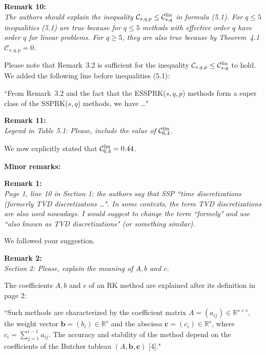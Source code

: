 \documentclass[12pt]{article}
\newcommand{\remark}[2]{\vspace{25pt} \noindent \textbf{Remark #1:\newline} \textit{#2}\vspace{15pt}}
\renewcommand{\newline}{\vspace{15pt}\\}
\newcommand{\sspcoef}{\mathcal{C}}
\newcommand{\clin}{\sspcoef^{\textnormal{lin}}_{s,q}}
\begin{document}
\remark{10}{
The authors should explain the inequality $\sspcoef_{s,q,p} \leq \clin$ in formula (5.1). 
For $q \leq 5$ inequalities (5.1) are true because for $q \leq 5$ methods with effective 
order $q$ have order $q$ for linear problems. 
For $q \geq 5$, they are also true because by Theorem~4.1 $\sspcoef_{s,q,p}  = 0$.}

Please note that Remark~3.2 is sufficient for the inequality 
$\sspcoef_{s,q,p} \leq \clin$ to hold.
We added the following line before inequalities (5.1):

``From Remark~3.2 and the fact that the ESSPRK($s,q,p$) methods 
form a super class of the SSPRK($s,q$) methods, we have \dots"

\pagebreak

\remark{11}{
Legend in Table 5.1: Please, include the value of $\sspcoef^{\textnormal{lin}}_{6,4}$.}

We now explicitly stated that $\sspcoef^{\textnormal{lin}}_{6,4}=0.44$.
\vspace{40pt}

\noindent \textbf{\large Minor remarks:}

\remark{1}{
Page 1, line 10 in Section 1: the authors say that SSP ``time discretizations (formerly
TVD discretizatons \dots". 
In some contexts, the term TVD discretizations are also used nowadays. 
I would suggest to change the term ``formely" and use ``also known as TVD discretizations" 
(or something similar).}

We followed your suggestion.

\remark{2}{
Section 2: Please, explain the meaning of $A, b$ and $c$.}

The coefficients $A, b$ and $c$ of an RK method are explained after its definition in page 2:

``Such methods are characterized by the coefficient matrix $A = (a_{ij}) \in 
\mathbb{R}^{s \times s}$, the weight vector $\bm{b} = (b_i) \in \mathbb{R}^s$
and the abscissa $\bm{c} = (c_i) \in \mathbb{R}^s$, where 
$c_i = \sum_{j=1}^{i-1}a_{ij}$.
The accuracy and stability of the method depend on the coefficients of the 
Butcher tableau $(A,\bm{b},\bm{c})$ [4]."
\end{document}
